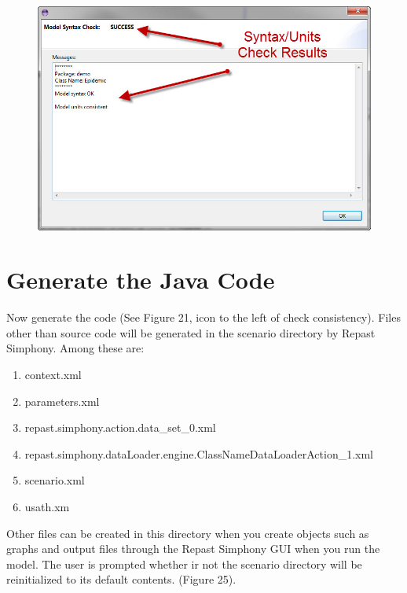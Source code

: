 \documentclass[11pt]{amsart}
\begin{document}
\begin{figure}[ht]
\begin{center}
\vspace{.2in}
\centerline {
\includegraphics[totalheight=0.3\textheight]{images/024.jpg}
}
\caption{}
\label{fig:024}
\end{center}
\end{figure}

\section{Generate the Java Code}
Now generate the code (See Figure 21, icon to the left of check consistency). Files other than source code will be generated in the scenario directory by Repast Simphony. Among these are:

\begin{enumerate}
\item context.xml
\item parameters.xml
\item repast.simphony.action.data\_set\_0.xml
\item repast.simphony.dataLoader.engine.ClassNameDataLoaderAction\_1.xml
\item scenario.xml
\item usath.xm
\end{enumerate}
\vspace{.2in}

Other files can be created in this directory when you create objects such as graphs and output files through the Repast Simphony GUI when you run the model. The user is prompted whether ir not the scenario directory will be reinitialized to its default contents. (Figure 25).
\end{document}
